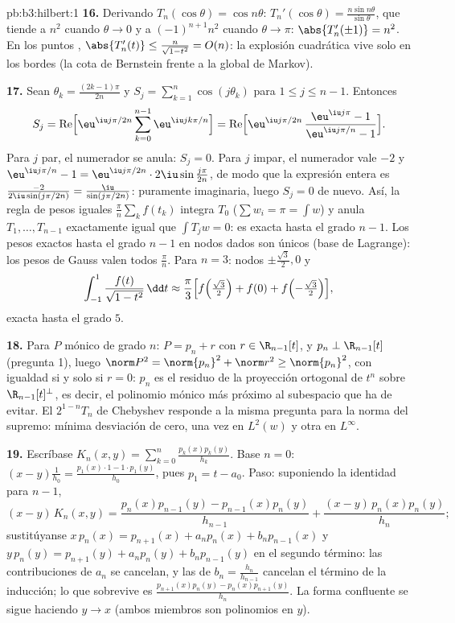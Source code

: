\begin{solution}{pb:b3:hilbert:1}
\textbf{16.} Derivando $T_n(\cos\theta) = \cos
n\theta$: $T_n'(\cos\theta) = \frac{n\sin n\theta}
{\sin\theta}$, que tiende a $n^2$ cuando $\theta \to 0$ y a
$(-1)^{n+1}n^2$ cuando $\theta \to \pi$: $\abs{T_n'(\pm1)} =
n^2$. En los puntos ,
$\abs{T_n'(t)} \leq
\frac{n}{\sqrt{1 - t^2}} = O(n)$: la explosión cuadrática vive solo en
los bordes (la cota  de
Bernstein frente a la global de Markov).

\textbf{17.} Sean $\theta_k = \frac{(2k-1)\pi}{2n}$ y $S_j
= \sum_{k=1}^n\cos(j\theta_k)$ para $1 \leq j \leq n-1$. Entonces
\[
S_j = \operatorname{Re}\Bigl[\eu^{\iu j\pi/2n}
\sum_{k=0}^{n-1}\eu^{\iu jk\pi/n}\Bigr]
= \operatorname{Re}\Bigl[\eu^{\iu j\pi/2n}\,
\frac{\eu^{\iu j\pi} - 1}{\eu^{\iu j\pi/n} - 1}\Bigr] .
\]
Para $j$ par, el numerador se anula: $S_j = 0$. Para $j$ impar, el
numerador vale $-2$ y $\eu^{\iu j\pi/n} - 1 =
\eu^{\iu j\pi/2n}\cdot2\iu\sin\frac{j\pi}{2n}$, de modo que la expresión
entera es $\frac{-2}{2\iu\sin(j\pi/2n)} =
\frac{\iu}{\sin(j\pi/2n)}$: puramente imaginaria, luego $S_j = 0$ de
nuevo. Así, la regla de pesos iguales $\frac\pi n\sum_kf(t_k)$ integra
$T_0$ ($\sum w_i = \pi = \int w$) y anula $T_1,
\dots, T_{n-1}$ exactamente igual que $\int T_jw = 0$: es exacta hasta
el grado $n - 1$. Los pesos exactos hasta el grado $n-1$ en nodos dados
son únicos (base de Lagrange): los pesos de Gauss valen todos
$\frac\pi n$. Para $n = 3$: nodos $\pm\frac{\sqrt3}2, 0$ y
\[
\int_{-1}^1\frac{f(t)}{\sqrt{1 - t^2}}\,\dd t \approx
\frac\pi3\Bigl[f\Bigl(\tfrac{\sqrt3}2\Bigr) + f(0) +
f\Bigl(-\tfrac{\sqrt3}2\Bigr)\Bigr],
\]
exacta hasta el grado $5$.

\textbf{18.} Para $P$ mónico de grado $n$: $P = p_n + r$ con
$r \in \R_{n-1}[t]$, y $p_n \perp \R_{n-1}[t]$ (pregunta 1), luego
$\norm P^2 = \norm{p_n}^2 + \norm r^2 \geq
\norm{p_n}^2$, con igualdad si y solo si $r = 0$: $p_n$ es el residuo de
la proyección ortogonal de $t^n$ sobre $\R_{n-1}[t]^\perp$, es decir, el
polinomio mónico más próximo al subespacio que ha de evitar. El
$2^{1-n}T_n$ de Chebyshev responde a la misma pregunta para la norma del
supremo: mínima desviación de cero, una vez en $L^2(w)$ y otra en
$L^\infty$.

\textbf{19.} Escríbase $K_n(x, y) =
\sum_{k=0}^n\frac{p_k(x)p_k(y)}{h_k}$. Base $n = 0$: $(x -
y)\frac1{h_0} = \frac{p_1(x)\cdot1 - 1\cdot p_1(y)}{h_0}$, pues
$p_1 = t - a_0$. Paso: suponiendo la identidad para $n -
1$,
\[
(x - y)\,K_n(x,y) = \frac{p_n(x)p_{n-1}(y) -
p_{n-1}(x)p_n(y)}{h_{n-1}} +
\frac{(x - y)\,p_n(x)p_n(y)}{h_n} ;
\]
sustitúyanse $x\,p_n(x) = p_{n+1}(x) + a_np_n(x) +
b_np_{n-1}(x)$ y $y\,p_n(y) = p_{n+1}(y) + a_np_n(y) +
b_np_{n-1}(y)$ en el segundo término: las contribuciones de $a_n$ se
cancelan, y las de $b_n = \frac{h_n}{h_{n-1}}$ cancelan el término de la
inducción; lo que sobrevive es
$\frac{p_{n+1}(x)p_n(y) - p_n(x)p_{n+1}(y)}{h_n}$. La forma confluente
se sigue haciendo $y \to x$ (ambos miembros son polinomios en $y$).


\end{solution}
